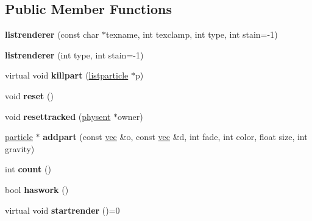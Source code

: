 \subsection*{Public Member Functions}
\begin{DoxyCompactItemize}
\item 
\mbox{\label{structlistrenderer_a15a3e7471ffc508143c57f9c1be5f54b}} 
{\bfseries listrenderer} (const char $\ast$texname, int texclamp, int type, int stain=-\/1)
\item 
\mbox{\label{structlistrenderer_abf4292767ecff924466177aa3a7449f8}} 
{\bfseries listrenderer} (int type, int stain=-\/1)
\item 
\mbox{\label{structlistrenderer_a61fb68c938016c6ad914abb34b09931c}} 
virtual void {\bfseries killpart} (\hyperlink{structlistparticle}{listparticle} $\ast$p)
\item 
\mbox{\label{structlistrenderer_a90668f026e251abdb473dd19ad896211}} 
void {\bfseries reset} ()
\item 
\mbox{\label{structlistrenderer_a6bd0b93a715ff5bddeb19710cc0f6e1b}} 
void {\bfseries resettracked} (\hyperlink{structphysent}{physent} $\ast$owner)
\item 
\mbox{\label{structlistrenderer_a181631d9404294032fd5fac7e108dcd6}} 
\hyperlink{structparticle}{particle} $\ast$ {\bfseries addpart} (const \hyperlink{structvec}{vec} \&o, const \hyperlink{structvec}{vec} \&d, int fade, int color, float size, int gravity)
\item 
\mbox{\label{structlistrenderer_a4b48ed65c6e4e716e3d17fe0ea25e50d}} 
int {\bfseries count} ()
\item 
\mbox{\label{structlistrenderer_ac59425138eaf467aadb06ac4beafbf9e}} 
bool {\bfseries haswork} ()
\item 
\mbox{\label{structlistrenderer_afea3803b4e867a66a4bdb5c268be8e0d}} 
virtual void {\bfseries startrender} ()=0
\item 
\mbox{\label{structlistrenderer_a05b8adaf68ac7736a4490e72925f3c43}} 

\end{DoxyCompactItemize}
